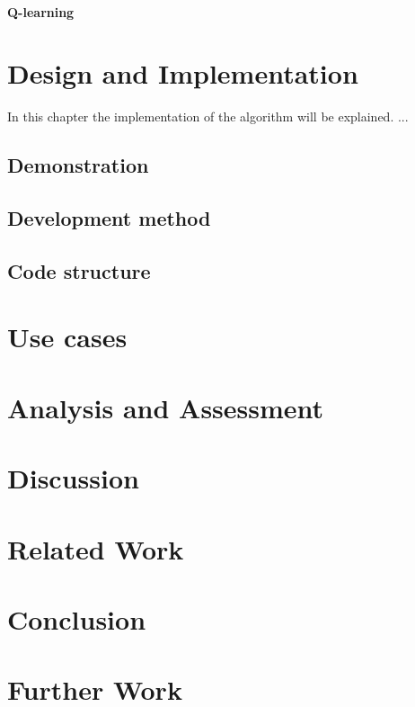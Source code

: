 \documentclass[a4paper]{report}
\begin{document}
\subsubsection{Q-learning} \label{Q-learning}



\chapter{Design and Implementation} \label{Design and Implementation}
In this chapter the implementation of the algorithm will be explained. ...
\section{Demonstration} \label{demonstration}
\section{Development method}
\section{Code structure} \label{CodeStructure}


\chapter{Use cases} \label{Use Cases}
\chapter{Analysis and Assessment}\label{Analysis and Assessment}
\chapter{Discussion} \label{Discussion}
\chapter{Related Work} \label{Related Work}
\chapter{Conclusion} \label{Conclusion}
\chapter{Further Work} \label{Further Work}

\appendix


%
%
\printbibliography
\end{document}
